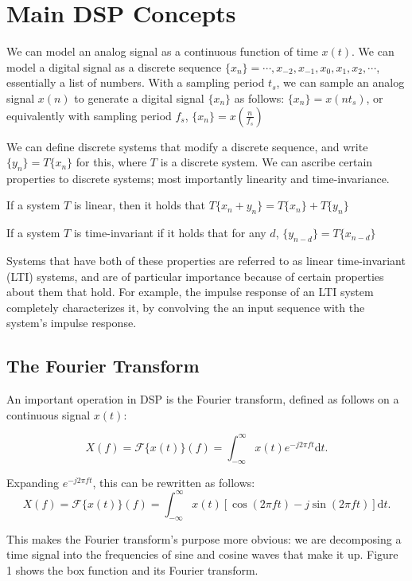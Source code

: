 \documentclass[12pt]{article}
\begin{document}
\section{Main DSP Concepts}

We can model an analog signal as a continuous function of time $x(t)$. We can model a digital signal as a discrete sequence $\{x_n\} = \cdots, x_{-2}, x_{-1}, x_0, x_1, x_2, \cdots$, essentially a list of numbers.  With a sampling period $t_s$, we can sample an analog signal $x(n)$ to generate a digital signal $\{x_n\}$ as follows: $\{x_n\} = x(nt_s)$, or equivalently with sampling period  $f_s$, $\{x_n\} = x(\frac{n}{f_s})$

We can define discrete systems that modify a discrete sequence, and write $\{y_n\} = T\{x_n\}$ for this, where $T$ is a discrete system. We can ascribe certain properties to discrete systems; most importantly linearity and time-invariance.

If a system $T$ is linear, then it holds that $T\{x_n + y_n\} = T\{x_n\} + T\{y_n\}$

If a system $T$ is time-invariant if it holds that for any $d$, $\{y_{n-d}\} = T\{x_{n-d}\}$

Systems that have both of these properties are referred to as linear time-invariant (LTI) systems, and are of particular importance because of certain properties about them that hold. For example, the impulse response of an LTI system completely characterizes it, by convolving the an input sequence with the system's impulse response.

\subsection{The Fourier Transform}

An important operation in DSP is the Fourier transform, defined as follows on a continuous signal $x(t)$:

\[
  X(f) = \mathcal{F}\{x(t)\}(f) = \int_{-\infty}^\infty x(t)e^{-j 2 \pi f t} \mathrm{d}t
.\] 

Expanding $e^{-j2\pi f t}$, this can be rewritten as follows:
\[
  X(f) = \mathcal{F}\{x(t)\}(f) =  \int_{-\infty}^\infty x(t)\left[\cos(2\pi f t) - j\sin(2\pi f t)\right] \mathrm{d}t
.\] 

This makes the Fourier transform's purpose more obvious: we are decomposing a time signal into the frequencies of sine and cosine waves that make it up. Figure 1 shows the box function and its Fourier transform.
\end{document}
